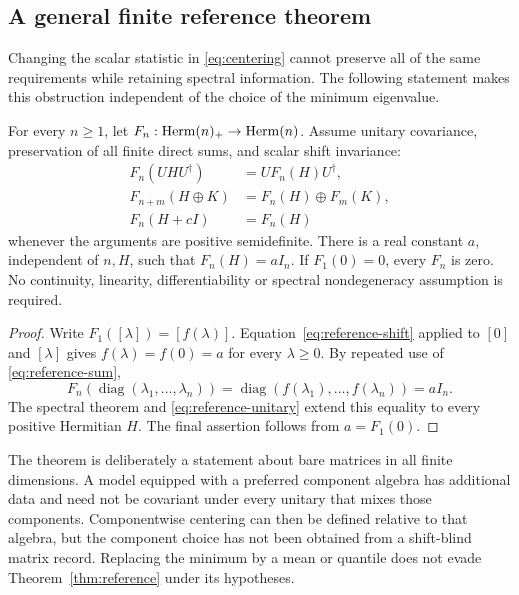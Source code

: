 \subsection{A general finite reference theorem}

Changing the scalar statistic in \eqref{eq:centering} cannot preserve all of the
same requirements while retaining spectral information.
The following statement makes this obstruction independent of the choice of
the minimum eigenvalue.

\begin{theorem}
\label{thm:reference}
For every $n\geq1$, let
$F_n:\operatorname{Herm}(n)_+\to\operatorname{Herm}(n)$.
Assume unitary covariance, preservation of all finite direct sums, and scalar
shift invariance:
\begin{align}
 F_n(UHU^\dagger)&=UF_n(H)U^\dagger,
 \label{eq:reference-unitary}\\
 F_{n+m}(H\oplus K)&=F_n(H)\oplus F_m(K),
 \label{eq:reference-sum}\\
 F_n(H+cI)&=F_n(H)
 \label{eq:reference-shift}
\end{align}
whenever the arguments are positive semidefinite.
There is a real constant $a$, independent of $n,H$, such that
$F_n(H)=aI_n$.
If $F_1(0)=0$, every $F_n$ is zero.
No continuity, linearity, differentiability or spectral nondegeneracy
assumption is required.
\end{theorem}
\begin{proof}
Write $F_1([\lambda])=[f(\lambda)]$.
Equation~\eqref{eq:reference-shift} applied to $[0]$ and $[\lambda]$ gives
$f(\lambda)=f(0)=a$ for every $\lambda\geq0$.
By repeated use of \eqref{eq:reference-sum},
\[
 F_n(\operatorname{diag}(\lambda_1,\ldots,\lambda_n))
 =\operatorname{diag}(f(\lambda_1),\ldots,f(\lambda_n))=aI_n.
\]
The spectral theorem and \eqref{eq:reference-unitary} extend this equality to
every positive Hermitian $H$.
The final assertion follows from $a=F_1(0)$.
\end{proof}

The theorem is deliberately a statement about bare matrices in all finite
dimensions.
A model equipped with a preferred component algebra has additional data and
need not be covariant under every unitary that mixes those components.
Componentwise centering can then be defined relative to that algebra, but the
component choice has not been obtained from a shift-blind matrix record.
Replacing the minimum by a mean or quantile does not evade
Theorem~\ref{thm:reference} under its hypotheses.

